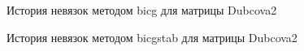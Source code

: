 \begin{figure}[h!]
    \renewcommand{\figurename}{Рисунок}
    \caption{История невязок методом bicg для матрицы Dubcova2}
    \label{fig:image}
\end{figure}

\begin{figure}
    \renewcommand{\figurename}{Рисунок}
    \caption{История невязок методом bicgstab для матрицы Dubcova2}
    \label{fig:image}
\end{figure}

